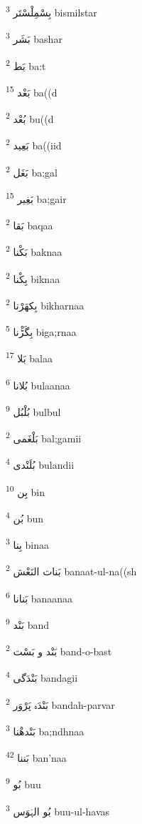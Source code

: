 \documentclass[12pt]{article}
\begin{document}
\begin{RTL}
\begin{multicols}{5}
{\ur بِسْمِلْسْتَر}   \textsuperscript{3} bismilstar

{\ur بَشَر}   \textsuperscript{3} bashar

{\ur بَط}   \textsuperscript{2} ba:t

{\ur بَعْد}   \textsuperscript{15} ba((d

{\ur بُعْد}   \textsuperscript{2} bu((d

{\ur بَعِید}   \textsuperscript{2} ba((iid

{\ur بَغَل}   \textsuperscript{2} ba;gal

{\ur بَغِیر}   \textsuperscript{15} ba;gair

{\ur بَقا}   \textsuperscript{2} baqaa

{\ur بَکْنا}   \textsuperscript{2} baknaa

{\ur بِکْنا}   \textsuperscript{2} biknaa

{\ur بِکھَرْنا}   \textsuperscript{2} bikharnaa

{\ur بِگَڑْنا}   \textsuperscript{5} biga;rnaa

{\ur بَلا}   \textsuperscript{17} balaa

{\ur بُلانا}   \textsuperscript{6} bulaanaa

{\ur بُلْبُل}   \textsuperscript{9} bulbul

{\ur بَلْغَمی}   \textsuperscript{2} bal;gamii

{\ur بُلَنْدی}   \textsuperscript{4} bulandii

{\ur بِن}   \textsuperscript{10} bin

{\ur بُن}   \textsuperscript{4} bun

{\ur بِنا}   \textsuperscript{3} binaa

{\ur بَنات النَعْش}   \textsuperscript{2} banaat-ul-na((sh

{\ur بَنانا}   \textsuperscript{6} banaanaa

{\ur بَنْد}   \textsuperscript{9} band

{\ur بَنْد و بَسْت}   \textsuperscript{2} band-o-bast

{\ur بَنْدَگی}   \textsuperscript{4} bandagii

{\ur بَنْدَہ پَرْوَر}   \textsuperscript{2} bandah-parvar

{\ur بَنْدھْنا}   \textsuperscript{3} ba;ndhnaa

{\ur بَننا}   \textsuperscript{42} ban'naa

{\ur بُو}   \textsuperscript{9} buu

{\ur بُو الہَوَس}   \textsuperscript{3} buu-ul-havas


\end{multicols}
\end{RTL}
\end{document}
